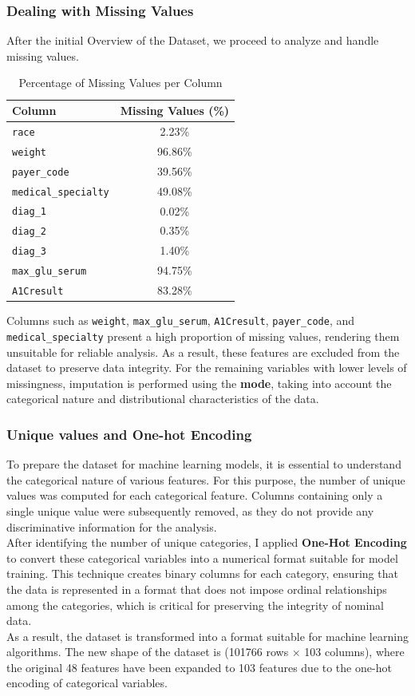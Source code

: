 \subsubsection{Dealing with Missing Values}
After the initial Overview of the Dataset, we proceed to analyze and handle missing values. 
\begin{table}[H]
\centering
\caption{Percentage of Missing Values per Column}
\label{tab:missing-values}
\begin{tabular}{|l|c|}
\hline
\textbf{Column} & \textbf{Missing Values (\%)} \\
\hline
\texttt{race} & 2.23\% \\
\texttt{weight} & 96.86\% \\
\texttt{payer\_code} & 39.56\% \\
\texttt{medical\_specialty} & 49.08\% \\
\texttt{diag\_1} & 0.02\% \\
\texttt{diag\_2} & 0.35\% \\
\texttt{diag\_3} & 1.40\% \\
\texttt{max\_glu\_serum} & 94.75\% \\
\texttt{A1Cresult} & 83.28\% \\
\hline
\end{tabular}
\end{table}

\noindent
Columns such as \texttt{weight}, \texttt{max\_glu\_serum}, \texttt{A1Cresult}, \texttt{payer\_code}, and \texttt{medical\_specialty} present a high proportion of missing values, rendering them unsuitable for reliable analysis. As a result, these features are excluded from the dataset to preserve data integrity. For the remaining variables with lower levels of missingness, imputation is performed using the \textbf{mode}, taking into account the categorical nature and distributional characteristics of the data.

\subsubsection{Unique values and One-hot Encoding}
To prepare the dataset for machine learning models, it is essential to understand the categorical nature of various features. For this purpose, the number of unique values was computed for each categorical feature. Columns containing only a single unique value were subsequently removed, as they do not provide any discriminative information for the analysis.\\
After identifying the number of unique categories, I applied \textbf{One-Hot Encoding} to convert these categorical variables into a numerical format suitable for model training. This technique creates binary columns for each category, ensuring that the data is represented in a format that does not impose ordinal relationships among the categories, which is critical for preserving the integrity of nominal data.\\
As a result, the dataset is transformed into a format suitable for machine learning algorithms. The new shape of the dataset is (101766 rows × 103 columns), where the original 48 features have been expanded to 103 features due to the one-hot encoding of categorical variables.


